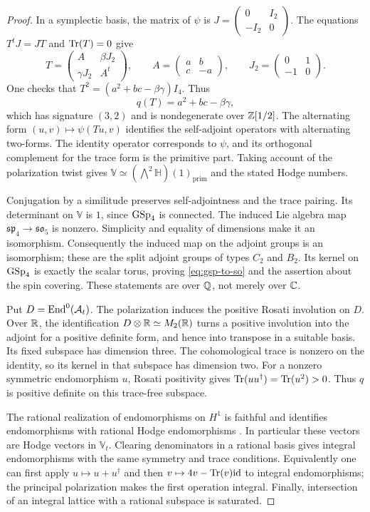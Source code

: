 \begin{proof}
In a symplectic basis, the matrix of $\psi$ is
$J=\left(\begin{smallmatrix}0&I_2\\-I_2&0\end{smallmatrix}\right)$.
The equations $T^tJ=JT$ and $\operatorname{Tr}(T)=0$ give
\[
 T=\begin{pmatrix}A&\beta J_2\\ \gamma J_2&A^t\end{pmatrix},
 \qquad A=\begin{pmatrix}a&b\\c&-a\end{pmatrix},
 \qquad J_2=\begin{pmatrix}0&1\\-1&0\end{pmatrix}.
\]
One checks that $T^2=(a^2+bc-\beta\gamma)I_4$.  Thus
\[
 q(T)=a^2+bc-\beta\gamma,
\]
which has signature $(3,2)$ and is nondegenerate over $\mathbb Z[1/2]$.
The alternating form $(u,v)\mapsto\psi(Tu,v)$ identifies the
self-adjoint operators with alternating two-forms.  The identity operator
corresponds to $\psi$, and its orthogonal complement for the trace form
is the primitive part.  Taking account of the polarization twist gives
$\mathbb V\simeq(\bigwedge^2\mathbb H)(1)_{\mathrm{prim}}$ and the stated
Hodge numbers.

Conjugation by a similitude preserves self-adjointness and the trace
pairing.  Its determinant on $\mathbb V$ is $1$, since $\operatorname{GSp}_4$ is
connected.  The induced Lie algebra map
$\mathfrak{sp}_4\to\mathfrak{so}_5$ is nonzero.  Simplicity and equality
of dimensions make it an isomorphism.  Consequently the induced map on
the adjoint groups is an isomorphism; these are the split adjoint groups
of types $C_2$ and $B_2$.  Its kernel on $\operatorname{GSp}_4$ is exactly the scalar
torus, proving \eqref{eq:gsp-to-so} and the assertion about the spin
covering.  These statements are over $\mathbb Q$, not merely over $\mathbb C$.

Put $D=\operatorname{End}^0(\mathcal A_t)$.  The polarization induces the positive
Rosati involution on $D$.  Over $\mathbb R$, the identification
$D\otimes\mathbb R\simeq M_2(\mathbb R)$ turns a positive involution into the adjoint
for a positive definite form, and hence into transpose in a suitable
basis.  Its fixed subspace has dimension three.  The cohomological
trace is nonzero on the identity, so its kernel in that subspace has
dimension two.  For a nonzero symmetric endomorphism $u$, Rosati
positivity gives $\operatorname{Tr}(uu^\dagger)=\operatorname{Tr}(u^2)>0$.  Thus $q$ is positive
definite on this trace-free subspace.

The rational realization of endomorphisms on $H^1$ is faithful and
identifies endomorphisms with rational Hodge endomorphisms
\cite[Theorem~4.1]{MilneShimura1995}.  In particular
these vectors are Hodge vectors in $\mathbb V_t$.  Clearing denominators
in a rational basis gives integral endomorphisms with the same symmetry
and trace conditions.  Equivalently one can first apply
$u\mapsto u+u^\dagger$ and then
$v\mapsto4v-\operatorname{Tr}(v)\mathrm{id}$ to integral endomorphisms; the principal
polarization makes the first operation integral.  Finally, intersection
of an integral lattice with a rational subspace is saturated.
\end{proof}


